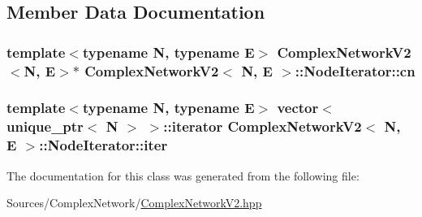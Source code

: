 \subsection{Member Data Documentation}
\hypertarget{class_complex_network_v2_1_1_node_iterator_a7aca01bd523af976364fda7f3387dcfa}{
\subsubsection[{cn}]{\setlength{\rightskip}{0pt plus 5cm}template$<$typename N, typename E$>$ {\bf Complex\+Network\+V2}$<$N, E$>$$\ast$ {\bf Complex\+Network\+V2}$<$ N, E $>$\+::Node\+Iterator\+::cn\hspace{0.3cm}{\ttfamily [private]}}}\label{class_complex_network_v2_1_1_node_iterator_a7aca01bd523af976364fda7f3387dcfa}
\hypertarget{class_complex_network_v2_1_1_node_iterator_a0adc6d6ed60285560415c59e3e21fba8}{
\subsubsection[{iter}]{\setlength{\rightskip}{0pt plus 5cm}template$<$typename N, typename E$>$ vector$<$ unique\+\_\+ptr$<$ N $>$ $>$\+::iterator {\bf Complex\+Network\+V2}$<$ N, E $>$\+::Node\+Iterator\+::iter\hspace{0.3cm}{\ttfamily [private]}}}\label{class_complex_network_v2_1_1_node_iterator_a0adc6d6ed60285560415c59e3e21fba8}


The documentation for this class was generated from the following file\+:\begin{DoxyCompactItemize}
\item 
Sources/\+Complex\+Network/\hyperlink{_complex_network_v2_8hpp}{Complex\+Network\+V2.\+hpp}\end{DoxyCompactItemize}
